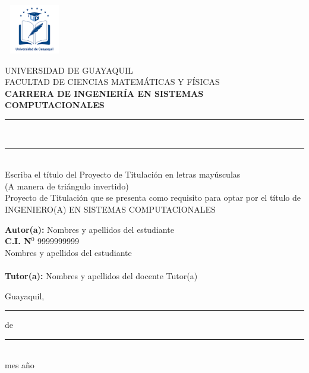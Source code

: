 \documentclass[12pt, a4paper, nofontenc, numbers=endperiod]{apa7}
\begin{document}
	{ %
		\begin{center}	
			\includegraphics[width=2.65cm,height=2.17cm]{Imagenes/Figura1}
		\end{center}
		\begin{center}	
			UNIVERSIDAD DE GUAYAQUIL \\[-0.1cm]
			FACULTAD DE CIENCIAS MATEMÁTICAS Y FÍSICAS \\ [-0.1cm]
			\textbf{ CARRERA DE INGENIERÍA EN SISTEMAS COMPUTACIONALES}
		\end{center}
		\begin{center}
			\rule[1mm]{125mm}{0.1mm}  \\[0.5cm]
			\rule[1mm]{100mm}{0.1mm}  \vspace*{0.5cm} \\
			Escriba el título del Proyecto de Titulación en letras mayúsculas \\
			(A manera de triángulo invertido)	\\
			\vspace*{1cm}	
			Proyecto de Titulación que se presenta como requisito para optar por el título de \\
			INGENIERO(A) EN SISTEMAS COMPUTACIONALES	
		\end{center}
		\vspace*{1.5cm}
		\begin{flushright}
			\begin{minipage}[b]{10cm}
				\hspace*{2.4cm}\textbf{Autor(a):} Nombres y apellidos del estudiante \\
				\hspace*{6.5cm}\textbf{C.I. N$^{0}$ }9999999999\\
				\hspace*{4.1cm}\color{red} Nombres y apellidos del estudiante \\
					\\
					\hspace*{1.2cm}\textbf{Tutor(a):} Nombres y apellidos del docente Tutor(a)
				\end{minipage}
			\end{flushright}
			\vspace*{0.7cm}
			\begin{center}
				\singlespacing Guayaquil,\rule[0mm]{10mm}{0.1mm} de \rule[0mm]{10mm}{0.1mm}\\
				\hspace{1.5cm} mes \hspace{0.5cm}  año
			\end{center}
		}
\end{document}
